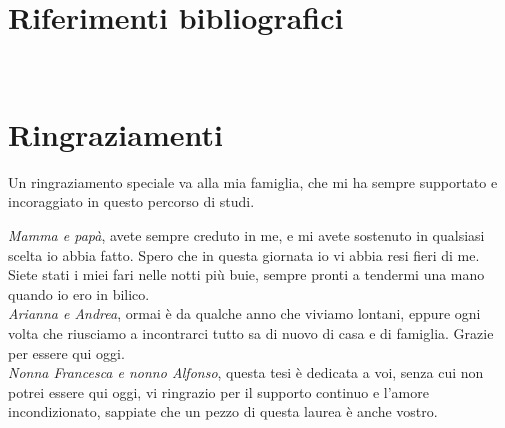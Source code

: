 \documentclass[12pt,a4paper,twoside]{book}
\begin{document}



\renewcommand{\bibsection}{}
\chapter*{Riferimenti bibliografici}

\newpage

\newpage~\newpage
\chapter*{Ringraziamenti}
Un ringraziamento speciale va alla mia famiglia, che mi ha sempre supportato e incoraggiato
in questo percorso di studi.

\emph{Mamma e papà}, avete sempre creduto in me, e mi avete sostenuto in qualsiasi scelta io abbia fatto.
Spero che in questa giornata io vi abbia resi fieri di me. Siete stati i miei fari nelle notti più buie,
sempre pronti a tendermi una mano quando io ero in bilico. \\
\emph{Arianna e Andrea}, ormai è da qualche anno che viviamo lontani, eppure ogni volta che riusciamo a
incontrarci tutto sa di nuovo di casa e di famiglia. Grazie per essere qui oggi. \\
\emph{Nonna Francesca e nonno Alfonso}, questa tesi è dedicata a voi, senza cui non potrei essere qui oggi,
vi ringrazio per il supporto continuo e l'amore incondizionato, sappiate che un pezzo di questa laurea
è anche vostro.
\end{document}
